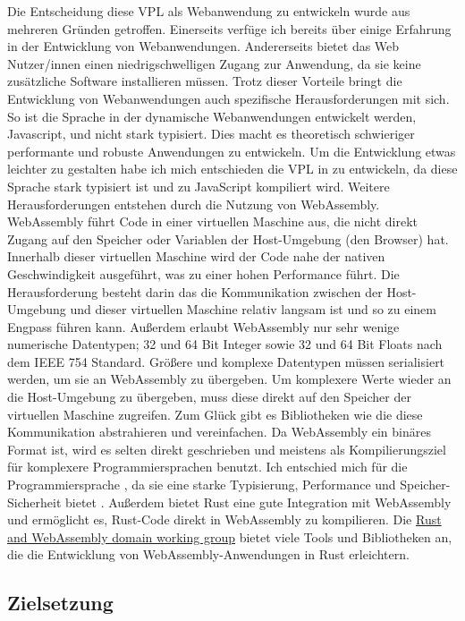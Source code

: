 \documentclass[ngerman]{article}
\begin{document}
Die Entscheidung diese VPL als Webanwendung zu entwickeln wurde aus mehreren Gründen getroffen. 
Einerseits verfüge ich bereits über einige Erfahrung in der Entwicklung von Webanwendungen. 
Andererseits bietet das Web Nutzer/innen einen niedrigschwelligen Zugang zur Anwendung, da sie keine zusätzliche Software installieren müssen.
\br
Trotz dieser Vorteile bringt die Entwicklung von Webanwendungen auch spezifische Herausforderungen mit sich.
So ist die Sprache in der dynamische Webanwendungen entwickelt werden, Javascript,  und nicht stark typisiert. 
Dies macht es theoretisch schwieriger performante und robuste Anwendungen zu entwickeln. 
Um die Entwicklung etwas leichter zu gestalten habe ich mich entschieden die VPL in  zu entwickeln, da diese Sprache stark typisiert ist und zu JavaScript kompiliert wird.
\br
Weitere Herausforderungen entstehen durch die Nutzung von WebAssembly. 
WebAssembly führt Code in einer virtuellen Maschine aus, die nicht direkt Zugang auf den Speicher oder Variablen der Host-Umgebung (den Browser) hat.
Innerhalb dieser virtuellen Maschine wird der Code nahe der nativen Geschwindigkeit ausgeführt, was zu einer hohen Performance führt. 
Die Herausforderung besteht darin das die Kommunikation zwischen der Host-Umgebung und dieser virtuellen Maschine relativ langsam ist und so zu einem Engpass führen kann.
\br
Außerdem erlaubt WebAssembly nur sehr wenige numerische Datentypen; 32 und 64 Bit Integer sowie 32 und 64 Bit Floats nach dem IEEE 754 Standard. 
Größere und komplexe Datentypen müssen serialisiert werden, um sie an WebAssembly zu übergeben. 
Um komplexere Werte wieder an die Host-Umgebung zu übergeben, muss diese direkt auf den Speicher der virtuellen Maschine zugreifen.
Zum Glück gibt es Bibliotheken wie  die diese Kommunikation abstrahieren und vereinfachen.
\br
Da WebAssembly ein binäres Format ist, wird es selten direkt geschrieben und meistens als Kompilierungsziel für komplexere Programmiersprachen benutzt.
Ich entschied mich für die Programmiersprache , da sie eine starke Typisierung, Performance und Speicher-Sicherheit bietet \cite{bugden2022rust}.
Außerdem bietet Rust eine gute Integration mit WebAssembly und ermöglicht es, Rust-Code direkt in WebAssembly zu kompilieren. 
Die \href{https://rustwasm.github.io/}{Rust and WebAssembly domain working group} bietet viele Tools und Bibliotheken an, die die Entwicklung von WebAssembly-Anwendungen in Rust erleichtern.

\subsection{Zielsetzung} 
\label{sec:Zielsetzung}
\end{document}
